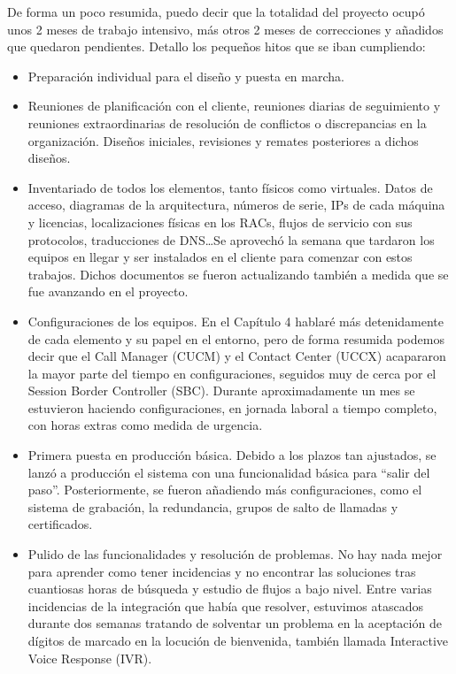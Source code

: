 \documentclass[a4paper, 12pt]{book}
\begin{document}
De forma un poco resumida, puedo decir que la totalidad del proyecto ocupó unos 2 meses de trabajo intensivo, más otros 2 meses de correcciones y añadidos que quedaron pendientes. Detallo los pequeños hitos que se iban cumpliendo:
\begin{itemize}
  \item Preparación individual para el diseño y puesta en marcha.
  
  \item Reuniones de planificación con el cliente, reuniones diarias de seguimiento y reuniones extraordinarias de resolución de conflictos o discrepancias en la organización. Diseños iniciales, revisiones y remates posteriores a dichos diseños.

  \item Inventariado de todos los elementos, tanto físicos como virtuales. Datos de acceso, diagramas de la arquitectura, números de serie, IPs de cada máquina y licencias, localizaciones físicas en los RACs, flujos de servicio con sus protocolos, traducciones de DNS\ldots Se aprovechó la semana que tardaron los equipos en llegar y ser instalados en el cliente para comenzar con estos trabajos. Dichos documentos se fueron actualizando también a medida que se fue avanzando en el proyecto.

  \item Configuraciones de los equipos. En el Capítulo 4 hablaré más detenidamente de cada elemento y su papel en el entorno, pero de forma resumida podemos decir que el Call Manager (CUCM) y el Contact Center (UCCX) acapararon la mayor parte del tiempo en configuraciones, seguidos muy de cerca por el Session Border Controller (SBC). Durante aproximadamente un mes se estuvieron haciendo configuraciones, en jornada laboral a tiempo completo, con horas extras como medida de urgencia.

  \item Primera puesta en producción básica. Debido a los plazos tan ajustados, se lanzó a producción el sistema con una funcionalidad básica para ``salir del paso''. Posteriormente, se fueron añadiendo más configuraciones, como el sistema de grabación, la redundancia, grupos de salto de llamadas y certificados.

  \item Pulido de las funcionalidades y resolución de problemas. No hay nada mejor para aprender como tener incidencias y no encontrar las soluciones tras cuantiosas horas de búsqueda y estudio de flujos a bajo nivel. Entre varias incidencias de la integración que había que resolver, estuvimos atascados durante dos semanas tratando de solventar un problema en la aceptación de dígitos de marcado en la locución de bienvenida, también llamada Interactive Voice Response (IVR).
  

\end{itemize}
\end{document}
